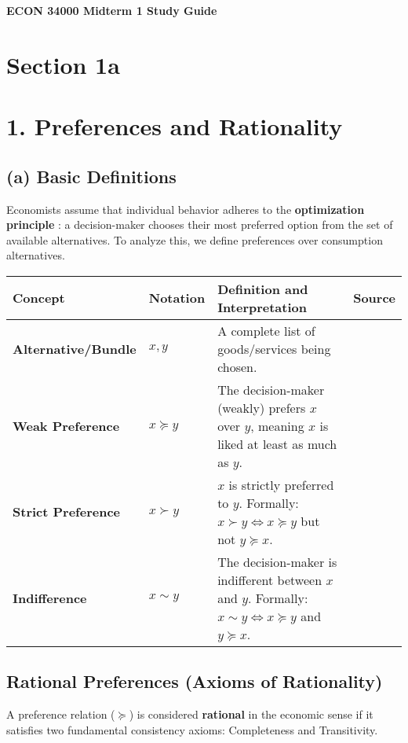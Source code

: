 \documentclass{article}
\begin{document}
\begin{center}
    {\Huge \textbf{ECON 34000 Midterm 1 Study Guide}}
\end{center}

\section*{Section 1a}

\section*{1. Preferences and Rationality}

\subsection*{ (a) Basic Definitions}

Economists assume that individual behavior adheres to the \textbf{optimization principle} : a decision-maker chooses their most preferred option from the set of available alternatives. To analyze this, we define preferences over consumption alternatives.

\begin{center}
\begin{tabular}{>{\bfseries}l l p{11cm} l}
\toprule
\textbf{Concept} & \textbf{Notation} & \textbf{Definition and Interpretation} & \textbf{Source} \\
\midrule
Alternative/Bundle & $x, y$ & A complete list of goods/services being chosen. & \\
Weak Preference & $x \succeq y$ & The decision-maker (weakly) prefers $x$ over $y$, meaning $x$ is liked at least as much as $y$. & \\
Strict Preference & $x \succ y$ & $x$ is strictly preferred to $y$. Formally: $x \succ y \iff x \succeq y$ but not $y \succeq x$. & \\
Indifference & $x \sim y$ & The decision-maker is indifferent between $x$ and $y$. Formally: $x \sim y \iff x \succeq y$ and $y \succeq x$. & \\
\bottomrule
\end{tabular}
\end{center}

\subsection*{Rational Preferences (Axioms of Rationality)}

A preference relation ($\succeq$) is considered \textbf{rational} in the economic sense if it satisfies two fundamental consistency axioms: Completeness and Transitivity.
\end{document}
